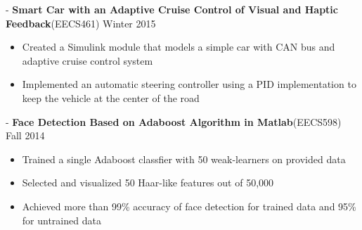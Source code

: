 \documentclass[11pt]{res}
\begin{document}
\begin{resume}
  -\sectionwidth \resumewidth  
\textbf{Smart Car with an Adaptive Cruise Control of Visual and Haptic Feedback}{(EECS461)}   \hfill{Winter 2015}  \hspace{-0.58in}\vspace{-0mm}\\
  \vspace{-14pt}
 \begin{itemize}[leftmargin=-0.1in]
  \item Created a Simulink module that models a simple car with CAN bus and adaptive cruise control system  \vspace{-5pt}
  \item Implemented an automatic steering controller using a PID implementation to keep the vehicle at the center of the road  \vspace{-3pt}
   \end{itemize}\vspace{-10pt}
     

 -\sectionwidth \resumewidth
\textbf{Face Detection Based on Adaboost Algorithm in Matlab}{(EECS598)}   \hfill{Fall 2014}  \hspace{-0.58in}\vspace{-0mm}\\
\vspace{-14pt}
 \begin{itemize}[leftmargin=-0.1in]
  \item Trained a single Adaboost classfier with 50 weak-learners on provided data  \vspace{-5pt}
  \item Selected and visualized 50 Haar-like features out of 50,000\vspace{-5pt}
  \item Achieved more than 99\% accuracy of face detection for trained data and 95\% for untrained data\vspace{-3pt}
  \end{itemize}\vspace{-10pt}



\end{resume}
\end{document}
